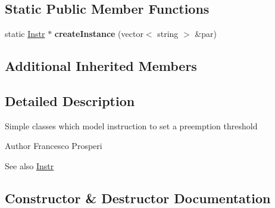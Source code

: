 \subsection*{Static Public Member Functions}
\begin{DoxyCompactItemize}
\item 
static \hyperlink{classRTSim_1_1Instr}{Instr} $\ast$ {\bfseries create\+Instance} (vector$<$ string $>$ \&par)\hypertarget{classRTSim_1_1SchedInstr_a9e1a2539bb2d4e129f7495607f1cdc74}{}\label{classRTSim_1_1SchedInstr_a9e1a2539bb2d4e129f7495607f1cdc74}

\end{DoxyCompactItemize}
\subsection*{Additional Inherited Members}


\subsection{Detailed Description}
Simple classes which model instruction to set a preemption threshold \begin{DoxyAuthor}{Author}
Francesco Prosperi 
\end{DoxyAuthor}
\begin{DoxySeeAlso}{See also}
\hyperlink{classRTSim_1_1Instr}{Instr} 
\end{DoxySeeAlso}


\subsection{Constructor \& Destructor Documentation}
